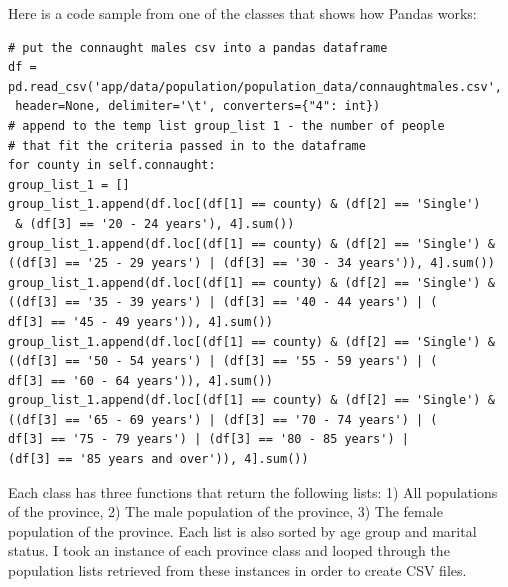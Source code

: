 Here is a code sample from one of the classes that shows how Pandas works:
\linebreak
\linebreak
\begin{verbatim}
# put the connaught males csv into a pandas dataframe
df = pd.read_csv('app/data/population/population_data/connaughtmales.csv',
 header=None, delimiter='\t', converters={"4": int})
# append to the temp list group_list 1 - the number of people 
# that fit the criteria passed in to the dataframe
for county in self.connaught:
group_list_1 = []
group_list_1.append(df.loc[(df[1] == county) & (df[2] == 'Single')
 & (df[3] == '20 - 24 years'), 4].sum())
group_list_1.append(df.loc[(df[1] == county) & (df[2] == 'Single') &
((df[3] == '25 - 29 years') | (df[3] == '30 - 34 years')), 4].sum())
group_list_1.append(df.loc[(df[1] == county) & (df[2] == 'Single') &
((df[3] == '35 - 39 years') | (df[3] == '40 - 44 years') | (
df[3] == '45 - 49 years')), 4].sum())
group_list_1.append(df.loc[(df[1] == county) & (df[2] == 'Single') &
((df[3] == '50 - 54 years') | (df[3] == '55 - 59 years') | (
df[3] == '60 - 64 years')), 4].sum())
group_list_1.append(df.loc[(df[1] == county) & (df[2] == 'Single') &
((df[3] == '65 - 69 years') | (df[3] == '70 - 74 years') | (
df[3] == '75 - 79 years') | (df[3] == '80 - 85 years') |
(df[3] == '85 years and over')), 4].sum())
\end{verbatim}
Each class has three functions that return the following lists: 1) All populations of the province, 2) The male population of the province, 3) The female population of the province. Each list is also sorted by age group and marital status. I took an instance of each province class and looped through the population lists retrieved from these instances in order to create CSV files. 
\pagebreak

